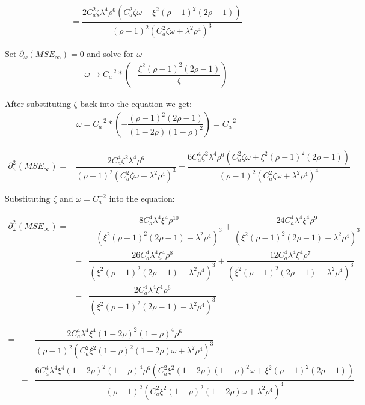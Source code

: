 \begin{subappendices}
\begin{eqnarray*}
=\dfrac{2 C_a^2 \zeta \lambda ^4 \rho ^6 \left(C_a^2 \zeta \omega +\xi ^2 (\rho -1)^2 (2 \rho -1)\right)}{(\rho -1)^2 \left(C_a^2 \zeta \omega +\lambda ^2 \rho ^4\right)^3}
\end{eqnarray*}

Set $\partial_{\omega}(MSE_{\infty})=0$ and solve for $\omega$
\begin{eqnarray*}
\omega \to C_a^{-2}*\left(-\dfrac{\xi ^2 (\rho -1)^2 (2 \rho -1)}{\zeta }\right)
\end{eqnarray*}

After substituting $\zeta$ back into the equation we get:
\begin{eqnarray*}
\omega = C_a^{-2} * \left(-\dfrac{(\rho -1)^2 (2 \rho -1)}{(1-2 \rho ) (1-\rho )^2}\right) = C_a^{-2}
\end{eqnarray*}

\begin{eqnarray*}
\partial_{\omega}^2(MSE_{\infty})=&
\dfrac{2 C_a^4 \zeta ^2 \lambda ^4 \rho ^6}{(\rho -1)^2 \left(C_a^2 \zeta \omega +\lambda ^2 \rho ^4\right)^3}-\dfrac{6 C_a^4 \zeta ^2 \lambda ^4 \rho ^6 \left(C_a^2 \zeta \omega +\xi ^2 (\rho -1)^2 (2 \rho -1)\right)}{(\rho -1)^2 \left(C_a^2 \zeta \omega +\lambda ^2 \rho ^4\right)^4}
\end{eqnarray*}

Substituting $\zeta$ and $\omega= C_a^{-2}$ into the equation:

\begin{eqnarray*}
\partial_{\omega}^2(MSE_{\infty})=&&-\dfrac{8 C_a^4 \lambda ^4 \xi ^4 \rho ^{10}}{\left(\xi ^2 (\rho -1)^2 (2 \rho -1)-\lambda ^2 \rho ^4\right)^3}+\dfrac{24 C_a^4 \lambda ^4 \xi ^4 \rho ^9}{\left(\xi ^2 (\rho -1)^2 (2 \rho -1)-\lambda ^2 \rho ^4\right)^3}\\&-&\dfrac{26 C_a^4 \lambda ^4 \xi ^4 \rho ^8}{\left(\xi ^2 (\rho -1)^2 (2 \rho -1)-\lambda ^2 \rho ^4\right)^3}+\dfrac{12 C_a^4 \lambda ^4 \xi ^4 \rho ^7}{\left(\xi ^2 (\rho -1)^2 (2 \rho -1)-\lambda ^2 \rho ^4\right)^3}\\&-&\dfrac{2 C_a^4 \lambda ^4 \xi ^4 \rho ^6}{\left(\xi ^2 (\rho -1)^2 (2 \rho -1)-\lambda ^2 \rho ^4\right)^3}
\end{eqnarray*}

\begin{eqnarray*}
=&&\dfrac{2 C_a^4 \lambda ^4 \xi ^4 (1-2 \rho )^2 (1-\rho )^4 \rho ^6}{(\rho -1)^2 \left(C_a^2 \xi ^2 (1-\rho )^2 (1-2 \rho ) \omega +\lambda ^2 \rho ^4\right)^3}\\&-&\dfrac{6 C_a^4 \lambda ^4 \xi ^4 (1-2 \rho )^2 (1-\rho )^4 \rho ^6 \left(C_a^2 \xi ^2 (1-2 \rho ) (1-\rho )^2 \omega +\xi ^2 (\rho -1)^2 (2 \rho -1)\right)}{(\rho -1)^2 \left(C_a^2 \xi ^2 (1-\rho )^2 (1-2 \rho ) \omega +\lambda ^2 \rho ^4\right)^4}
\end{eqnarray*}


\end{subappendices}
